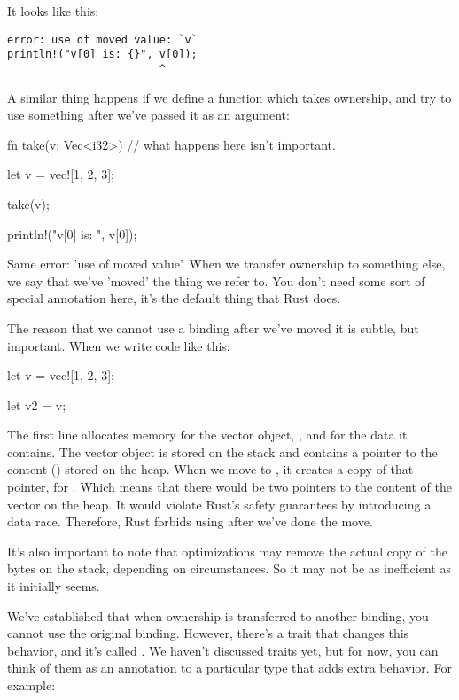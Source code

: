 It looks like this:

\begin{verbatim}
error: use of moved value: `v`
println!("v[0] is: {}", v[0]);
                        ^
\end{verbatim}

A similar thing happens if we define a function which takes ownership, and try to use something after we've passed it as an 
argument:

\begin{rustc}
fn take(v: Vec<i32>) {
    // what happens here isn't important.
}

let v = vec![1, 2, 3];

take(v);

println!("v[0] is: {}", v[0]);
\end{rustc}

Same error: 'use of moved value'. When we transfer ownership to something else, we say that we've 'moved' the thing we refer to. 
You don't need some sort of special annotation here, it's the default thing that Rust does.


The reason that we cannot use a binding after we've moved it is subtle, but important. When we write code like this:

\begin{rustc}
let v = vec![1, 2, 3];

let v2 = v;
\end{rustc}

The first line allocates memory for the vector object, , and for the data it contains. The vector object is stored on the 
stack and contains a pointer to the content (\code{[1, 2, 3]}) stored on the heap. When we move  to , it creates 
a copy of that pointer, for . Which means that there would be two pointers to the content of the vector on the heap. It 
would violate Rust's safety guarantees by introducing a data race. Therefore, Rust forbids using  after we've done the move.

\blank

It's also important to note that optimizations may remove the actual copy of the bytes on the stack, depending on circumstances. 
So it may not be as inefficient as it initially seems.


We've established that when ownership is transferred to another binding, you cannot use the original binding. However, there's a 
trait that changes this behavior, and it's called . We haven't discussed traits yet, but for now, you can think of them 
as an annotation to a particular type that adds extra behavior. For example:

